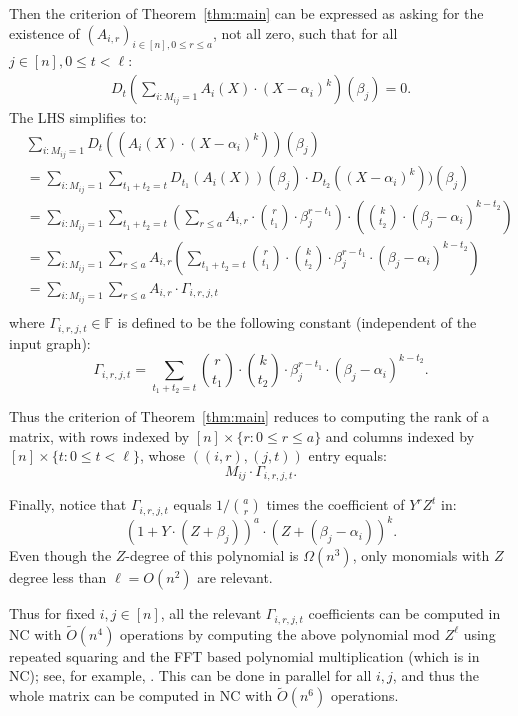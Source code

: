 \documentclass{article}
\newcommand{\F}{\mathbb{F}}
\begin{document}
Then the criterion of Theorem~\ref{thm:main} can be expressed as asking for the existence of $(A_{i,r})_{i \in [n], 0 \leq r \leq a}$, not all zero, such that for all $j \in [n], 0 \leq t < \ell$:
\begin{align*}
     D_t \left( \sum_{i : M_{ij} = 1 }   A_i(X)  \cdot (X-\alpha_i)^k  \right) (\beta_j)  = 0.
\end{align*} 
The LHS simplifies to:
\begin{align*}
&\sum_{i : M_{ij} = 1 }  D_t ( ( A_i(X)  \cdot (X-\alpha_i)^k ) ) (\beta_j)  \\
     &= \sum_{i : M_{ij} = 1 }   \sum_{t_1 + t_2 = t} D_{t_1}(A_i(X)) (\beta_j)  \cdot D_{t_2}((X-\alpha_i)^k ) ) (\beta_j) \\
     &= \sum_{i : M_{ij} = 1 }    \sum_{t_1 + t_2 = t} \left(\sum_{r \leq a}  A_{i,r}\cdot  {r \choose t_1} \cdot \beta_j^{r-t_1} \right) \cdot \left( {k \choose t_2} \cdot (\beta_j - \alpha_i)^{k-t_2}\right) \\
     &= \sum_{i : M_{ij} = 1 }  \sum_{r \leq a} A_{i,r}   \left( \sum_{t_1 + t_2 = t}  {r \choose t_1}\cdot  {k \choose t_2} \cdot \beta_j^{r-t_1} \cdot  (\beta_j - \alpha_i)^{k-t_2}\right) \\
     &= \sum_{i : M_{ij} = 1 }  \sum_{r \leq a} A_{i,r}  \cdot \Gamma_{i,r,j,t} \\
\end{align*} 
where $\Gamma_{i,r, j, t} \in \F$ is defined to be the following constant (independent of the input graph):
$$ \Gamma_{i,r,j,t} =   \sum_{t_1 + t_2 = t}  {r \choose t_1}\cdot  {k \choose t_2} \cdot \beta_j^{r-t_1} \cdot  (\beta_j - \alpha_i)^{k-t_2}.$$




Thus the criterion of Theorem~\ref{thm:main} reduces to computing the rank of a matrix,
with rows indexed by $[n] \times \{r : 0 \leq r \leq a\}$ and columns indexed by $[n] \times \{t : 0 \leq t < \ell\}$, whose $((i,r) , (j, t))$  entry equals:
$$ M_{ij} \cdot \Gamma_{i,r,j,t}.$$


Finally, notice that $\Gamma_{i,r,j,t}$ equals  $1/{ a \choose r }$ times the coefficient of $Y^r Z^t$ in:
$$ (1 + Y \cdot (Z + \beta_j) )^a \cdot ( Z + (\beta_j - \alpha_i) )^k.$$
Even though the $Z$-degree of this polynomial is $\Omega(n^3)$,  only monomials with $Z$ degree less than $\ell = O(n^2)$ are relevant.

Thus for fixed $i,j \in [n]$, all the relevant $\Gamma_{i,r,j,t}$ coefficients can be computed in NC with $\tilde{O}(n^4)$ operations by computing the above polynomial mod $Z^\ell$ using repeated squaring and the FFT based polynomial multiplication (which is in NC); see, for example, \cite{BCS97}. This can be done in parallel for all $i,j$, and thus the whole matrix can be computed in NC with $\tilde{O}(n^6)$ operations.
\end{document}
